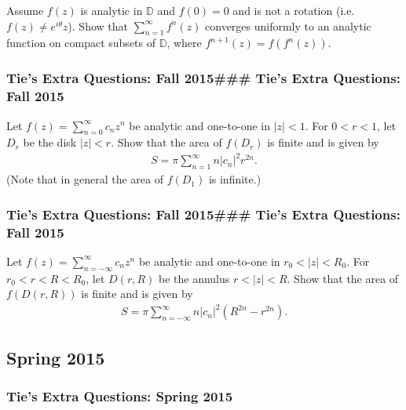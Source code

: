 Assume \(f(z)\) is analytic in \({\mathbb D}\) and \(f(0)=0\) and is not
a rotation (i.e.~\(f(z) \neq e^{i \theta} z\)). Show that
\(\displaystyle \sum_{n=1}^\infty f^{n}(z)\) converges uniformly to an
analytic function on compact subsets of \({\mathbb D}\), where
\(f^{n+1}(z) = f(f^{n}(z))\).

\hypertarget{ties-extra-questions-fall-2015-ties-extra-questions-fall-2015-14}{%
\subsubsection{Tie's Extra Questions: Fall 2015\#\#\# Tie's Extra
Questions: Fall
2015}\label{ties-extra-questions-fall-2015-ties-extra-questions-fall-2015-14}}

Let \(f(z) = \sum_{n=0}^\infty c_n z^n\) be analytic and one-to-one in
\(|z| < 1\). For \(0<r<1\), let \(D_r\) be the disk \(|z|<r\). Show that
the area of \(f(D_r)\) is finite and is given by
\begin{align*}S = \pi \sum_{n=1}^\infty n |c_n|^2 r^{2n}.\end{align*}
(Note that in general the area of \(f(D_1)\) is infinite.)

\hypertarget{ties-extra-questions-fall-2015-ties-extra-questions-fall-2015-15}{%
\subsubsection{Tie's Extra Questions: Fall 2015\#\#\# Tie's Extra
Questions: Fall
2015}\label{ties-extra-questions-fall-2015-ties-extra-questions-fall-2015-15}}

Let \(f(z) = \sum_{n= -\infty}^\infty c_n z^n\) be analytic and
one-to-one in \(r_0< |z| < R_0\). For \(r_0<r<R<R_0\), let \(D(r,R)\) be
the annulus \(r<|z|<R\). Show that the area of \(f(D(r,R))\) is finite
and is given by
\begin{align*}S = \pi \sum_{n=- \infty}^\infty n |c_n|^2 (R^{2n} - r^{2n}).\end{align*}

\hypertarget{spring-2015}{%
\subsection{Spring 2015}\label{spring-2015}}

\hypertarget{ties-extra-questions-spring-2015}{%
\subsubsection{Tie's Extra Questions: Spring
2015}\label{ties-extra-questions-spring-2015}}

